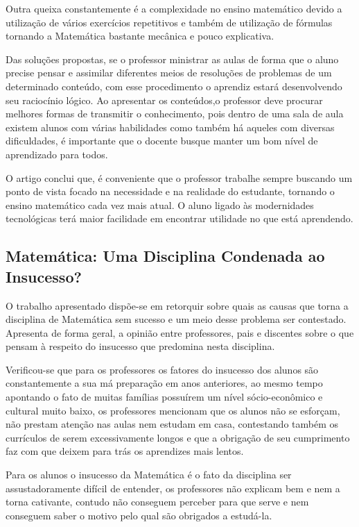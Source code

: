 \documentclass[12pt,a4paper]{article}
\begin{document}
Outra queixa constantemente é a complexidade no ensino matemático devido a utilização de vários exercícios repetitivos e também de utilização de fórmulas tornando a Matemática bastante mecânica e pouco explicativa. 

Das soluções propostas, se o professor ministrar as aulas de forma que o aluno precise pensar e assimilar diferentes meios de resoluções de problemas de um determinado conteúdo, com esse procedimento o aprendiz estará desenvolvendo seu raciocínio lógico.  
Ao apresentar os conteúdos,o professor deve procurar melhores formas de transmitir o conhecimento, pois dentro de uma sala de aula existem alunos com várias habilidades como também há aqueles com diversas dificuldades, é importante que o docente busque manter um bom nível de aprendizado para todos.

O artigo conclui que, é conveniente que o professor trabalhe sempre buscando um ponto de vista focado na necessidade e na realidade do estudante, tornando o ensino matemático cada vez mais atual. O aluno ligado às modernidades tecnológicas terá maior facilidade em encontrar utilidade no que está aprendendo. \citep{luiz2009}


\subsection{Matemática: Uma Disciplina Condenada ao Insucesso?}

O trabalho apresentado dispõe-se em retorquir sobre quais as causas que torna a disciplina de Matemática sem sucesso e um meio desse problema ser contestado. Apresenta de forma geral, a opinião entre professores, pais e discentes sobre o que pensam à respeito do insucesso que predomina nesta disciplina.

Verificou-se que para os professores os fatores do insucesso dos alunos são constantemente a sua má preparação em anos anteriores, ao mesmo tempo apontando o fato de muitas famílias possuírem um nível sócio-econômico e cultural muito baixo, os professores mencionam que os alunos não se esforçam, não prestam atenção nas aulas nem estudam em casa, contestando também os currículos de serem excessivamente longos e que a obrigação de seu cumprimento faz com que deixem para trás os aprendizes  mais lentos. 

Para os alunos o insucesso da Matemática é o fato da disciplina ser assustadoramente difícil de entender, os professores não explicam bem e nem a torna cativante, contudo não conseguem perceber para que serve e nem conseguem saber o motivo pelo qual são obrigados a estudá-la.
\end{document}
